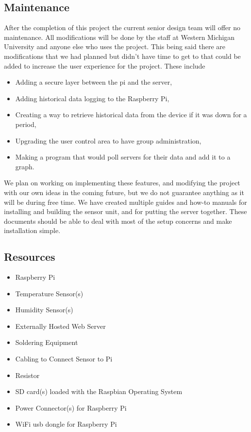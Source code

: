 \documentclass{report}
\begin{document}
\subsection*{Maintenance}
\indent
\indent
After the completion of this project the current senior design team will offer no maintenance. All modifications will be done by the staff at Western Michigan University and anyone else who uses the project. This being said there are modifications that we had planned but didn't have time to get to that could be added to increase the user experience for the project. These include
\begin{itemize}
	\item Adding a secure layer between the pi and the server,
	\item Adding historical data logging to the Raspberry Pi,
	\item Creating a way to retrieve historical data from the device if it was down for a period,
	\item Upgrading the user control area to have group administration,
	\item Making a program that would poll servers for their data and add it to a graph.
\end{itemize}
\indent
We plan on working on implementing these features, and modifying the project with our own ideas in the coming future, but we do not guarantee anything as it will be during free time. We have created multiple guides and how-to manuals for installing and building the sensor unit, and for putting the server together. These documents should be able to deal with most of the setup concerns and make installation simple.
\newpage

\subsection*{Resources}

\begin{itemize}
	\item Raspberry Pi
	\item Temperature Sensor(s)
	\item Humidity Sensor(s)
	\item Externally Hosted Web Server
	\item Soldering Equipment
	\item Cabling to Connect Sensor to Pi
	\item Resistor
	\item SD card(s) loaded with the Raspbian Operating System
	\item Power Connector(s) for Raspberry Pi
	\item WiFi usb dongle for Raspberry Pi
\end{itemize}
\newpage
\end{document}
